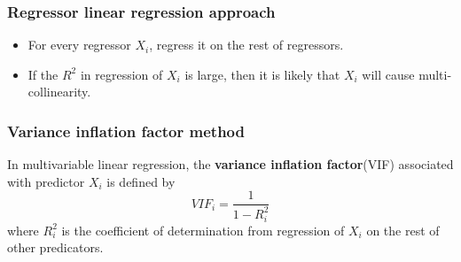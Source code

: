 \begin{refsection}
\subsubsection{Regressor linear regression approach}

\begin{method}\hfill
	\begin{itemize}
		\item For every regressor $X_i$, regress it on the rest of regressors.
		\item If the $R^2$ in regression of $X_i$ is large, then it is likely that $X_i$ will cause multi-collinearity.
	\end{itemize}
\end{method}


\subsubsection{Variance inflation factor method}

\begin{definition}\cite[335]{montgomery2012introduction}
	In multivariable linear regression, the \textbf{variance inflation factor}(VIF) associated with predictor $X_i$ is defined by
	$$VIF_i = \frac{1}{1-R_{i}^2}$$
	where $R^2_{i}$ is the coefficient of determination from regression of $X_i$ on the rest of other predicators.
\end{definition}



\end{refsection}
